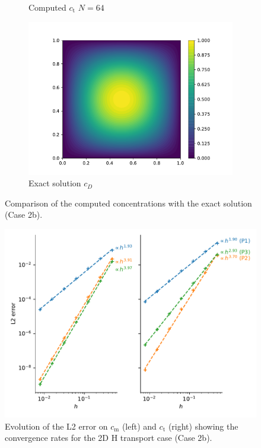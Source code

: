 \begin{figure}
\begin{subfigure}{0.3\linewidth}
        \caption{Computed $c_\mathrm{t}$ $N=64$}
    \end{subfigure}%
    \begin{subfigure}{0.3\linewidth}
        \centering
        \includegraphics[width=\linewidth]{Figures/Chapter2/c_exact.pdf}
        \caption{Exact solution $c_D$}
    \end{subfigure}
    \caption{Comparison of the computed concentrations with the exact solution (Case 2b).}
    \label{fig: results MMS 2D H transport}
\end{figure}

\begin{figure}
    \centering
    \includegraphics[width=\linewidth]{Figures/Chapter2/convergence_rate_H.pdf}
    \caption{Evolution of the L2 error on $c_\mathrm{m}$ (left) and $c_\mathrm{t}$ (right) showing the convergence rates for the 2D H transport case (Case 2b).}
    \label{fig: convergence rates H}
\end{figure}
